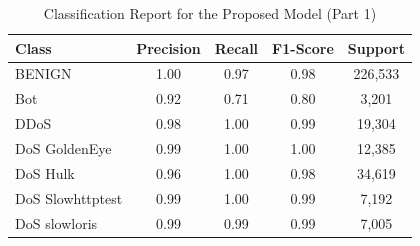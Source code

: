 \documentclass[conference]{IEEEtran}
\begin{document}
\begin{table}[!ht]
\centering
\caption{Classification Report for the Proposed Model (Part 1)}
\label{tab:classification_report_part1}
\begin{tabular}{|l|c|c|c|c|}
\hline
\textbf{Class}                   & \textbf{Precision} & \textbf{Recall} & \textbf{F1-Score} & \textbf{Support} \\ \hline
BENIGN                           & 1.00               & 0.97            & 0.98              & 226,533          \\ \hline
Bot                              & 0.92               & 0.71            & 0.80              & 3,201            \\ \hline
DDoS                             & 0.98               & 1.00            & 0.99              & 19,304           \\ \hline
DoS GoldenEye                    & 0.99               & 1.00            & 1.00              & 12,385           \\ \hline
DoS Hulk                         & 0.96               & 1.00            & 0.98              & 34,619           \\ \hline
DoS Slowhttptest                 & 0.99               & 1.00            & 0.99              & 7,192            \\ \hline
DoS slowloris                    & 0.99               & 0.99            & 0.99              & 7,005            \\ \hline
\end{tabular}
\end{table}
\end{document}
